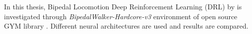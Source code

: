 In this thesis, Bipedal Locomotion Deep Reinforcement Learning (DRL) by is investigated through \textit{BipedalWalker-Hardcore-v3} \cite{noauthor_bipedalwalkerhardcore-v2_2021} environment of open source GYM library \cite{brockman_openai_2016}. Different neural architectures are used and results are compared. 
